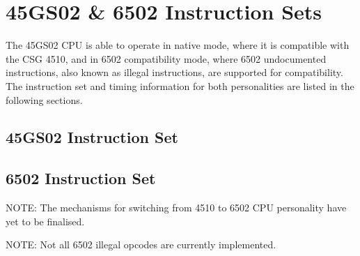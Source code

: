 \chapter{45GS02 \& 6502 Instruction Sets}

The 45GS02 CPU is able to operate in native mode, where it
is compatible with the CSG 4510, and in 6502 compatibility mode,
where 6502 undocumented instructions, also known as illegal
instructions, are supported for compatibility.  The instruction set and
timing information for both personalities are listed in the following
sections.

\section{45GS02 Instruction Set}



\section{6502 Instruction Set}

NOTE: The mechanisms for switching from 4510 to 6502 CPU personality
have yet to be finalised.

NOTE: Not all 6502 illegal opcodes are currently implemented.



